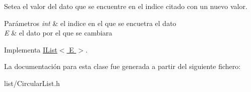 Setea el valor del dato que se encuentre en el indice citado con un nuevo valor. 


\begin{DoxyParams}{Parámetros}
{\em int} & el indice en el que se encuetra el dato \\
\hline
{\em E} & el dato por el que se cambiara \\
\hline
\end{DoxyParams}


Implementa \hyperlink{classIList_a119ed658d2804aec0b9fef9325c03073}{I\-List$<$ E $>$}.



La documentación para esta clase fue generada a partir del siguiente fichero\-:\begin{DoxyCompactItemize}
\item 
list/Circular\-List.\-h\end{DoxyCompactItemize}
